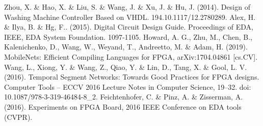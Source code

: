 \documentclass[11pt,journal,compsoc]{IEEEtran}
\begin{document}

%
%
%
\begin{thebibliography}{1}
Zhou, X. \& Hao, X. \& Liu, S. \& Wang, J. \& Xu, J. \& Hu, J. (2014). Design of Washing Machine Controller Based on VHDL. 194.10.1117/12.2780289. 
Alex, H. \& Ilya, B. \& Hg, F.. (2015). Digital Circuit Design Guide. Proceedings of EDA, IEEE, EDA System Foundation. 1097-1105. 
Howard, A. G., Zhu, M., Chen, B., Kalenichenko, D., Wang, W., Weyand, T., Andreetto, M. \& Adam, H. (2019). MobileNets: Efficient Compiling Languages for FPGA, arXiv:1704.04861 [cs.CV].
Wang, L., Xiong, Y. \& Wang, Z., Qiao, Y. \& Lin, D., Tang, X. \& Gool, L. V. (2016). Temporal Segment Networks: Towards Good Practices for FPGA designs. Computer Tools – ECCV 2016 Lecture Notes in Computer Science, 19–32. doi: 10.1087/978-3-319-46484-8\_2.
Feichtenhofer, C. \& Pinz, A. \& Zisserman, A. (2016). Experiments on FPGA Board, 2016 IEEE Conference on EDA tools (CVPR).



\end{thebibliography}




\end{document}

